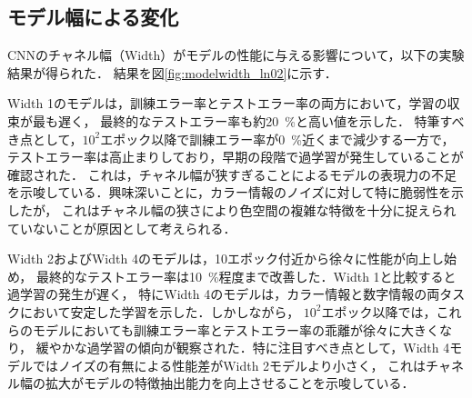 \newpage

\subsection{モデル幅による変化}

CNNのチャネル幅（Width）がモデルの性能に与える影響について，以下の実験結果が得られた．
結果を図\ref{fig:modelwidth_ln02}に示す．

Width 1のモデルは，訓練エラー率とテストエラー率の両方において，学習の収束が最も遅く，
最終的なテストエラー率も約\SI{20}{\percent}と高い値を示した．
特筆すべき点として，$10^2$エポック以降で訓練エラー率が\SI{0}{\percent}近くまで減少する一方で，
テストエラー率は高止まりしており，早期の段階で過学習が発生していることが確認された．
これは，チャネル幅が狭すぎることによるモデルの表現力の不足を示唆している．興味深いことに，カラー情報のノイズに対して特に脆弱性を示したが，
これはチャネル幅の狭さにより色空間の複雑な特徴を十分に捉えられていないことが原因として考えられる．

Width 2およびWidth 4のモデルは，10エポック付近から徐々に性能が向上し始め，
最終的なテストエラー率は\SI{10}{\percent}程度まで改善した．Width 1と比較すると過学習の発生が遅く，
特にWidth 4のモデルは，カラー情報と数字情報の両タスクにおいて安定した学習を示した．しかしながら，
$10^2$エポック以降では，これらのモデルにおいても訓練エラー率とテストエラー率の乖離が徐々に大きくなり，
緩やかな過学習の傾向が観察された．特に注目すべき点として，Width 4モデルではノイズの有無による性能差がWidth 2モデルより小さく，
これはチャネル幅の拡大がモデルの特徴抽出能力を向上させることを示唆している．

